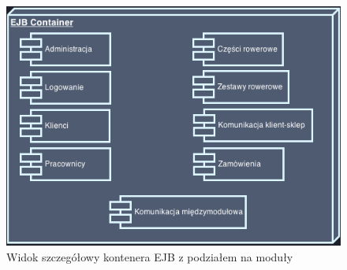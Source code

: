\begin{figure}[h!]
    \includegraphics[width=\textwidth,
    height=0.5\textheight]{graphics/EJB.png}
  \caption{Widok szczegółowy kontenera EJB z podziałem na moduły}
\end{figure}

